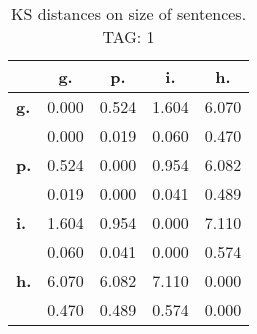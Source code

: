 \begin{table}[h!]
\begin{center}
\begin{tabular}{| l || c | c | c | c |}\hline
 & {\bf g.} & {\bf p.} & {\bf i.} & {\bf h.} \\\hline\hline
{\bf g.} & 0.000 & 0.524 & 1.604 & 6.070 \\
{\bf } & 0.000 & 0.019 & 0.060 & 0.470 \\\hline
{\bf p.} & 0.524 & 0.000 & 0.954 & 6.082 \\
{\bf } & 0.019 & 0.000 & 0.041 & 0.489 \\\hline
{\bf i.} & 1.604 & 0.954 & 0.000 & 7.110 \\
{\bf } & 0.060 & 0.041 & 0.000 & 0.574 \\\hline
{\bf h.} & 6.070 & 6.082 & 7.110 & 0.000 \\
{\bf } & 0.470 & 0.489 & 0.574 & 0.000 \\\hline
\end{tabular}
\caption{KS distances on size of sentences. TAG: 1}
\end{center}
\end{table}